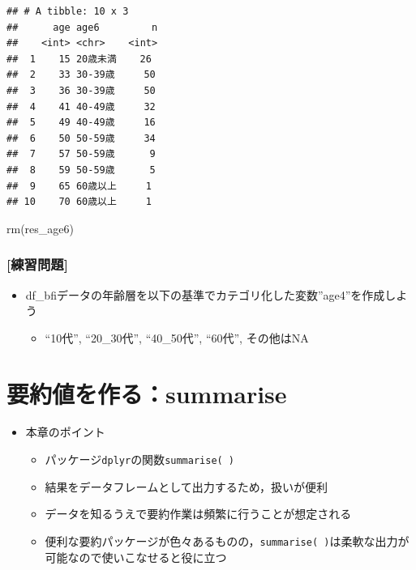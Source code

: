 \documentclass[
  xelatex,ja=standard, b5paper]{bxjsbook}
\newenvironment{Shaded}{\begin{snugshade}}{\end{snugshade}}
\newcommand{\FunctionTok}[1]{\textcolor[rgb]{0.00,0.00,0.00}{#1}}
\newcommand{\NormalTok}[1]{#1}
\providecommand{\tightlist}{%
  \setlength{\itemsep}{0pt}\setlength{\parskip}{0pt}}
\begin{document}
\begin{verbatim}
## # A tibble: 10 x 3
##      age age6         n
##    <int> <chr>    <int>
##  1    15 20歳未満    26
##  2    33 30-39歳     50
##  3    36 30-39歳     50
##  4    41 40-49歳     32
##  5    49 40-49歳     16
##  6    50 50-59歳     34
##  7    57 50-59歳      9
##  8    59 50-59歳      5
##  9    65 60歳以上     1
## 10    70 60歳以上     1
\end{verbatim}

\begin{Shaded}
\begin{Highlighting}[]
\FunctionTok{rm}\NormalTok{(res\_age6)}
\end{Highlighting}
\end{Shaded}

\hypertarget{ux7df4ux7fd2ux554fux984c-14}{%
\subsection{{[}練習問題{]}}\label{ux7df4ux7fd2ux554fux984c-14}}

\begin{itemize}
\tightlist
\item
  df\_bfiデータの年齢層を以下の基準でカテゴリ化した変数''age4''を作成しよう

  \begin{itemize}
  \tightlist
  \item
    ``10代'', ``20\_30代'', ``40\_50代'', ``60代'', その他はNA
  \end{itemize}
\end{itemize}

\hypertarget{summarise}{%
\chapter{要約値を作る：summarise}\label{summarise}}

\begin{itemize}
\tightlist
\item
  本章のポイント

  \begin{itemize}
  \tightlist
  \item
    パッケージ\texttt{dplyr}の関数\texttt{summarise(\ )}
  \item
    結果をデータフレームとして出力するため，扱いが便利
  \item
    データを知るうえで要約作業は頻繁に行うことが想定される
  \item
    便利な要約パッケージが色々あるものの，\texttt{summarise(\ )}は柔軟な出力が可能なので使いこなせると役に立つ
  \end{itemize}
\end{itemize}
\end{document}
